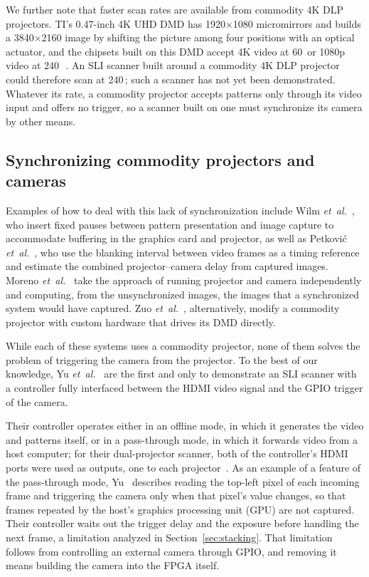 \documentclass[10pt,journal,compsoc]{IEEEtran}
\newcommand{\SI}[2]{#1\,#2}
\begin{document}
We further note that faster scan rates are available from commodity 4K DLP projectors. TI's
0.47-inch 4K UHD DMD has 1920$\times$1080 micromirrors and builds a 3840$\times$2160 image by
shifting the picture among four positions with an optical actuator, and the chipsets built on
this DMD accept 4K video at \SI{60}{\hertz} or 1080p video at
\SI{240}{\hertz}~\cite{ti_dlp471te,ti_dlpc6540}. An SLI scanner built around a commodity 4K DLP
projector could therefore scan at \SI{240}{\hertz}; such a scanner has not yet been demonstrated.
Whatever its rate, a commodity projector accepts patterns only through its video input and
offers no trigger, so a scanner built on one must synchronize its camera by other means.

\subsection{Synchronizing commodity projectors and cameras}
\label{sec:rw_sync}
Examples of how to deal with this lack of synchronization include Wilm
\emph{et~al.}~\cite{wilm2014calibration}, who insert fixed pauses between pattern presentation and
image capture to accommodate buffering in the graphics card and projector, as well as Petkovi\'c
\emph{et~al.}~\cite{petkovic2016software}, who use the blanking interval between video frames as
a timing reference and estimate the combined projector--camera delay from captured images. Moreno
\emph{et~al.}~\cite{moreno2015unsync} take the approach of running projector and camera
independently and computing, from the unsynchronized images, the images that a synchronized
system would have captured. Zuo \emph{et~al.}~\cite{zuo2012highspeed}, alternatively, modify a
commodity projector with custom hardware that drives its DMD directly.

While each of these systems uses a commodity projector, none of them solves the problem of
triggering the camera from the projector. To the best of our knowledge, Yu
\emph{et~al.}~\cite{yu2019dualspie,yu2020dualprojector} are the first and only to demonstrate an
SLI scanner with a controller fully interfaced between the HDMI video signal and the GPIO trigger
of the camera.

Their controller operates either in an offline mode, in which it generates the video and patterns
itself, or in a pass-through mode, in which it forwards video from a host computer; for their
dual-projector scanner, both of the controller's HDMI ports were used as outputs, one to each
projector~\cite{yu2020dualprojector}. As an example of a feature of the pass-through mode,
Yu~\cite{yu2019dissertation} describes reading the top-left pixel of each incoming frame and
triggering the camera only when that pixel's value changes, so that frames repeated by the host's
graphics processing unit (GPU) are not captured. Their controller waits out the trigger delay and
the exposure before handling the next frame, a limitation analyzed in
Section~\ref{sec:stacking}. That limitation follows from controlling an external camera through
GPIO, and removing it means building the camera into the FPGA itself.
\end{document}
